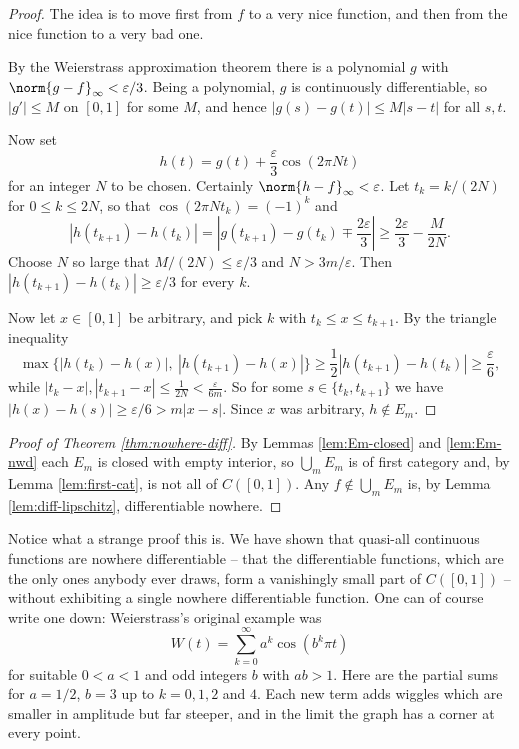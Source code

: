 \documentclass[a4paper]{scrartcl}
\begin{document}
\begin{proof}
	The idea is to move first from $f$ to a very nice function, and then from the nice function to a very bad one.

	By the Weierstrass approximation theorem there is a polynomial $g$ with $\norm{g-f}_\infty<\varepsilon/3$. Being a polynomial, $g$ is continuously differentiable, so $|g'|\leq M$ on $[0,1]$ for some $M$, and hence $|g(s)-g(t)|\leq M|s-t|$ for all $s,t$.

	Now set
	$$h(t) = g(t) + \frac{\varepsilon}{3}\cos(2\pi Nt)$$
	for an integer $N$ to be chosen. Certainly $\norm{h-f}_\infty<\varepsilon$. Let $t_k = k/(2N)$ for $0\leq k\leq 2N$, so that $\cos(2\pi Nt_k) = (-1)^k$ and
	$$|h(t_{k+1})-h(t_k)| = \left|g(t_{k+1})-g(t_k) \mp \frac{2\varepsilon}{3}\right| \geq \frac{2\varepsilon}{3} - \frac{M}{2N}.$$
	Choose $N$ so large that $M/(2N)\leq\varepsilon/3$ and $N > 3m/\varepsilon$. Then $|h(t_{k+1})-h(t_k)|\geq\varepsilon/3$ for every $k$.

	Now let $x\in[0,1]$ be arbitrary, and pick $k$ with $t_k\leq x\leq t_{k+1}$. By the triangle inequality
	$$\max\big\{|h(t_k)-h(x)|,\ |h(t_{k+1})-h(x)|\big\}\geq\frac12|h(t_{k+1})-h(t_k)| \geq \frac{\varepsilon}{6},$$
	while $|t_k - x|,|t_{k+1}-x|\leq\frac{1}{2N} < \frac{\varepsilon}{6m}$. So for some $s\in\{t_k,t_{k+1}\}$ we have $|h(x)-h(s)| \geq \varepsilon/6 > m|x-s|$. Since $x$ was arbitrary, $h\notin E_m$.
\end{proof}

\begin{proof}[Proof of Theorem \ref{thm:nowhere-diff}]
	By Lemmas \ref{lem:Em-closed} and \ref{lem:Em-nwd} each $E_m$ is closed with empty interior, so $\bigcup_mE_m$ is of first category and, by Lemma \ref{lem:first-cat}, is not all of $C([0,1])$. Any $f\notin\bigcup_mE_m$ is, by Lemma \ref{lem:diff-lipschitz}, differentiable nowhere.
\end{proof}

Notice what a strange proof this is. We have shown that quasi-all continuous functions are nowhere differentiable -- that the differentiable functions, which are the only ones anybody ever draws, form a vanishingly small part of $C([0,1])$ -- without exhibiting a single nowhere differentiable function. One can of course write one down: Weierstrass's original example was
$$W(t) = \sum_{k=0}^\infty a^k\cos(b^k\pi t)$$
for suitable $0<a<1$ and odd integers $b$ with $ab>1$. Here are the partial sums for $a=1/2$, $b=3$ up to $k=0,1,2$ and $4$. Each new term adds wiggles which are smaller in amplitude but far steeper, and in the limit the graph has a corner at every point.
\end{document}
